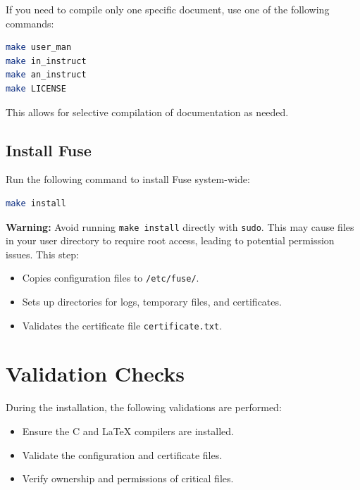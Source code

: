 \documentclass[a4paper,12pt]{article}
\begin{document}
\newpage

If you need to compile only one specific document, use one of the following commands:
\begin{lstlisting}[language=bash]
make user_man
make in_instruct
make an_instruct
make LICENSE
\end{lstlisting}
This allows for selective compilation of documentation as needed.

\subsection{Install Fuse}
Run the following command to install Fuse system-wide:
\begin{lstlisting}[language=bash]
make install
\end{lstlisting}
\textbf{Warning:} Avoid running \texttt{make install} directly with \texttt{sudo}. This may cause files in your user directory to require root access, leading to potential permission issues.
\newline
This step:
\begin{itemize}
	\item Copies configuration files to \texttt{/etc/fuse/}.
	\item Sets up directories for logs, temporary files, and certificates.
	\item Validates the certificate file \texttt{certificate.txt}.
\end{itemize}

\section{Validation Checks}
During the installation, the following validations are performed:
\begin{itemize}
	\item Ensure the C and LaTeX compilers are installed.
	\item Validate the configuration and certificate files.
	\item Verify ownership and permissions of critical files.
\end{itemize}

\newpage
\end{document}
